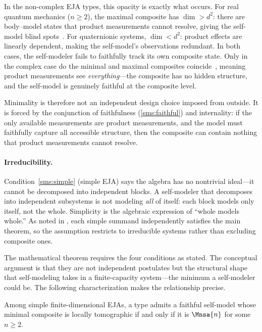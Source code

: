In the non-complex EJA types, this opacity is exactly what occurs.
For real quantum mechanics ($n \ge 2$), the maximal composite has
$\dim > d^{2}$: there are body--model states that product
measurements cannot resolve, giving the self-model blind
spots~\cite{BarnumWilce2014}.  For quaternionic systems, $\dim <
d^{2}$: product effects are linearly dependent, making the
self-model's observations redundant.  In both cases, the self-modeler
fails to faithfully track its own composite state.  Only in the
complex case do the minimal and maximal composites
coincide~\cite{Barnum2023}, meaning product measurements see
\emph{everything}---the composite has no hidden structure, and the
self-model is genuinely faithful at the composite level.

Minimality is therefore not an independent design choice imposed from
outside.  It is forced by the conjunction of faithfulness
(\ref{sms:faithful}) and internality: if the only available
measurements are product measurements, and the model must faithfully
capture all accessible structure, then the composite can contain
nothing that product measurements cannot resolve.

\paragraph{Irreducibility.}
Condition~\ref{sms:simple} (simple EJA) says the algebra has no
nontrivial ideal---it cannot be decomposed into independent blocks.
A self-modeler that decomposes into independent subsystems is not
modeling \emph{all} of itself: each block models only itself, not the
whole.  Simplicity is the algebraic expression of ``whole models
whole.''  As noted in , each simple summand
independently satisfies the main theorem, so the assumption restricts
to irreducible systems rather than excluding composite ones.

\medskip\noindent
The mathematical theorem requires the four conditions as stated.
The conceptual argument is that they are not independent postulates
but the structural shape that self-modeling takes in a finite-capacity
system---the minimum a self-modeler could be.  The following
characterization makes the relationship precise.

\begin{corollary}[Characterization]\label{cor:equivalence}
  Among simple finite-dimensional EJAs, a type admits a faithful
  self-model whose minimal composite is locally tomographic if and
  only if it is $\Mnsa{n}$ for some $n \geq 2$.
\end{corollary}

